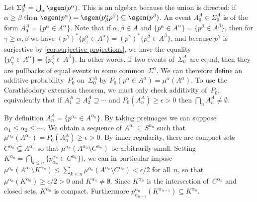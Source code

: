 Let \( \Sigma^A_0 = \bigcup_\alpha \sgen(p^\alpha) \).
This is an algebra because the union is directed:
if \( \alpha \ge \beta \)
then \( \sgen(p^\alpha) = \sgen(p^\alpha_\beta p^\beta)
\subseteq \sgen(p^\beta) \).
An event \( A^A_0 \in \Sigma^A_0 \)
is of the form \( A^A_0 = \{ p^\alpha \in A^\alpha \} \).
Note that if \( \alpha,\beta \in A \)
and \( \{ p^\alpha \in A^\alpha \} = \{ p^\beta \in A^\beta \} \),
then for \( \gamma \ge \alpha,\beta \)
we have
\( (p^\gamma)^* \{ p^\alpha_\gamma \in A^\alpha \}
=  (p^\gamma)^* \{ p^\beta _\gamma \in A^\beta  \}
\),
and because $p^\gamma$ is surjective
by \autoref{cor:surjective-projections},
we have the equality
\( \{ p^\alpha_\gamma \in A^\alpha \}
=  \{ p^\beta _\gamma \in A^\beta  \}
\).
In other words, if two events of~$\Sigma^A_0$ are equal,
then they are pullbacks of equal events in some common~$\Sigma^\gamma$.
We can therefore define an additive probability~$P_0$ on~$\Sigma^A_0$
by \( P_0(p^\alpha \in A^\alpha) = \mu^\alpha(A^\alpha) \).
To use the Carathéodory extension theorem,
we must only check \sig additivity of~$P_0$,
equivalently that if \( A^A_1 \supseteq A^A_2 \supseteq \dotsb \)
and \( P_0(A^A_n) \ge \epsilon > 0 \)
then \( \bigcap_n A^A_n \ne \emptyset \).

By definition \( A^A_n = \{ p^{\alpha_n} \in A^{\alpha_n} \} \).
By taking preimages we can suppose \( \alpha_1 \le \alpha_2 \le \dotsb\, \).
We obtain a sequence of \( A^{\alpha_n} \subseteq S^{\alpha_n} \)
such that
\( \mu^{\alpha_n}(A^{\alpha_n}) = P_0(A^A_n) \ge \epsilon > 0 \).
By inner regularity,
there are compact sets \( C^{\alpha_n} \subseteq A^{\alpha_n} \)
so that \( \mu^{\alpha_n}(A^{\alpha_n} \setminus C^{\alpha_n}) \)
be arbitrarily small.
Setting \( K^{\alpha_n} =
\bigcap_{k\le n} \{p^{\alpha_k}_{\alpha_n} \in C^{\alpha_k}\} \bigr) \),
we can in particular impose
\(  \mu^{\alpha_n}(A^{\alpha_n} \setminus K^{\alpha_n})
\le \sum_{k\le n} \mu^{\alpha_k}(A^{\alpha_k} \setminus C^{\alpha_k})
<   \epsilon/2
\) for all~$n$,
so that \( \mu^{\alpha_n}(K^{\alpha_n}) \ge \epsilon/2 > 0 \)
and \( K^{\alpha_n} \ne \emptyset \).
Since $K^{\alpha_n}$ is the intersection of~$C^{\alpha_n}$
and closed sets,
$K^{\alpha_n}$ is compact.
Furthermore \( p^{\alpha_n}_{\alpha_{n+1}}(K^{\alpha_{n+1}})
\subseteq K^{\alpha_n} \).
